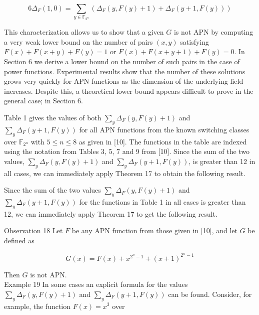 \documentclass[10pt]{article}
\begin{document}
\begin{equation*}
6 \Delta_{F}(1,0)=\sum_{y \in \mathbb{F}_{2^{n}}}\left(\Delta_{F}(y, F(y)+1)+\Delta_{F}(y+1, F(y))\right) \tag{29}
\end{equation*}


This characterization allows us to show that a given $G$ is not APN by computing a very weak lower bound on the number of pairs $(x, y)$ satisfying $F(x)+F(x+y)+F(y)=1$ or $F(x)+F(x+y+1)+F(y)=0$. In Section 6 we derive a lower bound on the number of such pairs in the case of power functions. Experimental results show that the number of these solutions grows very quickly for APN functions as the dimension of the underlying field increases. Despite this, a theoretical lower bound appears difficult to prove in the general case; in Section 6.

Table 1 gives the values of both $\sum_{y} \Delta_{F}(y, F(y)+1)$ and $\sum_{y} \Delta_{F}(y+1, F(y))$ for all APN functions from the known switching classes over $\mathbb{F}_{2^{n}}$ with $5 \leq n \leq 8$ as given in [10]. The functions in the table are indexed using the notation from Tables 3, 5, 7 and 9 from [10]. Since the sum of the two values, $\sum_{y} \Delta_{F}(y, F(y)+1)$ and $\sum_{y} \Delta_{F}(y+1, F(y))$, is greater than 12 in all cases, we can immediately apply Theorem 17 to obtain the following result.

Since the sum of the two values $\sum_{y} \Delta_{F}(y, F(y)+1)$ and $\sum_{y} \Delta_{F}(y+1, F(y))$ for the functions in Table 1 in all cases is greater than 12, we can immediately apply Theorem 17 to get the following result.

Observation 18 Let $F$ be any APN function from those given in [10], and let $G$ be defined as

$$
G(x)=F(x)+x^{2^{n}-1}+(x+1)^{2^{n}-1}
$$

Then $G$ is not APN.\\
Example 19 In some cases an explicit formula for the values $\sum_{y} \Delta_{F}(y, F(y)+1)$ and $\sum_{y} \Delta_{F}(y+1, F(y))$ can be found. Consider, for example, the function $F(x)=x^{3}$ over
\end{document}
